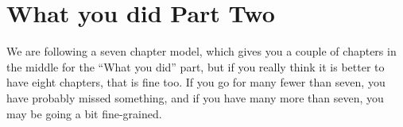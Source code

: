 %
%

\chapter{What you did Part Two}

We are following a seven chapter model, which gives you a couple of chapters in
the middle for the “What you did” part, but if you really think it is better to
have eight chapters, that is fine too.  If you go for many fewer than seven,
you have probably missed something, and if you have many more than seven, you
may be going a bit fine-grained.
